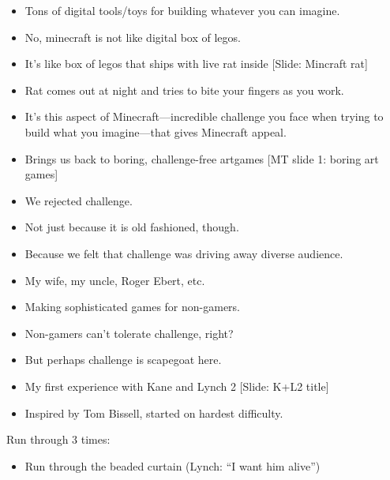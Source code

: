 \documentclass[12pt]{article}
\begin{document}
{\begin{itemize}
\item Tons of digital tools/toys for building whatever you can imagine.

\item No, minecraft is not like digital box of legos.




\item It's like box of legos that ships with live rat inside [Slide:  Mincraft rat]


\item Rat comes out at night and tries to bite your fingers as you work.

\item It's this aspect of Minecraft---incredible challenge you face when trying to build what you imagine---that gives Minecraft appeal.

\item Brings us back to boring, challenge-free artgames [MT slide 1: boring art games]

\item We rejected challenge.

\item Not just because it is old fashioned, though.

\item Because we felt that challenge was driving away diverse audience.

\item My wife, my uncle, Roger Ebert, etc.

\item Making sophisticated games for non-gamers.

\item Non-gamers can't tolerate challenge, right?

\item But perhaps challenge is scapegoat here.



\item My first experience with Kane and Lynch 2 [Slide:  K+L2 title]

\item Inspired by Tom Bissell, started on hardest difficulty.

\end{itemize}

\noindent Run through 3 times:
\begin{itemize}
\item Run through the beaded curtain (Lynch: ``I want him alive'')


\end{itemize}}
\end{document}
